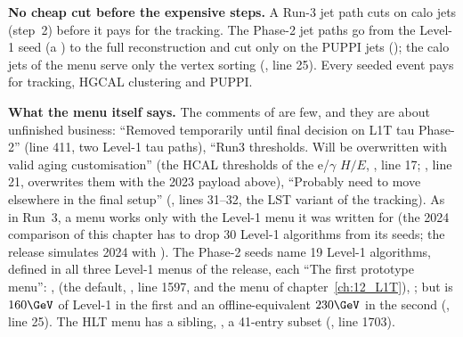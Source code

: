 \textbf{No cheap cut before the expensive steps.} A Run-3 jet path cuts on calo jets (step~2) before it pays for the
tracking. The Phase-2 jet paths go from the Level-1 seed (a ) to the full reconstruction and cut
only on the PUPPI jets (); the calo jets of the menu serve only the
vertex sorting (, line 25). Every seeded event pays for tracking, HGCAL
clustering and PUPPI.

\textbf{What the menu itself says.} The comments of  are few, and they are about unfinished business:
``Removed temporarily until final decision on L1T tau Phase-2'' (line 411, two Level-1 tau paths), ``Run3 thresholds.
Will be overwritten with valid aging customisation'' (the HCAL thresholds of the e/$\gamma$ $H/E$,
, line 17; , line 21, overwrites them with the 2023
payload above), ``Probably need to move elsewhere in the final setup'' (, lines
31--32, the LST variant of the tracking). As in Run~3, a menu works only with the Level-1 menu it was written for (the 2024 comparison
of this chapter has to drop 30 Level-1 algorithms from its seeds; the release simulates 2024 with ). The Phase-2 seeds
name 19 Level-1 algorithms, defined in all three Level-1 menus of the release, each ``The first prototype menu'':
,  (the default, , line 1597, and the menu of chapter~\ref{ch:12_L1T}),
; but  is $160\GeV$ of Level-1 \pt{} in the first and an
offline-equivalent $230\GeV$ in the second (, line 25). The HLT menu has a sibling,
, a 41-entry subset (, line 1703).
